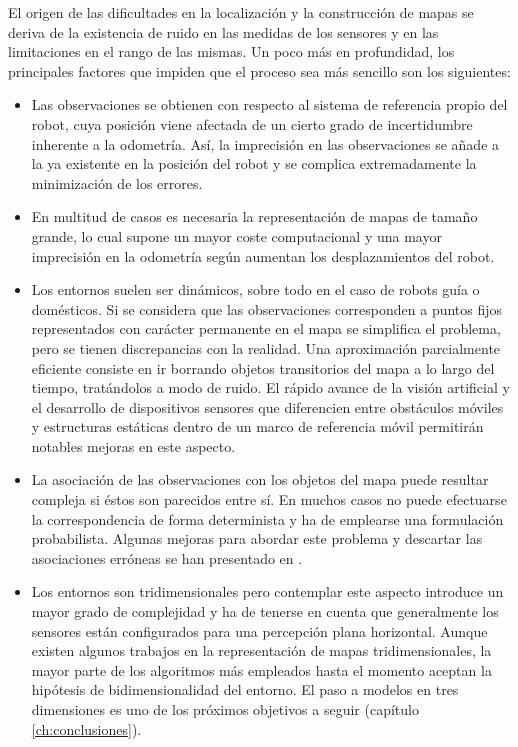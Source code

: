 El origen de las dificultades en la localización y la construcción de mapas se deriva de la existencia de ruido en las medidas de los sensores y en las limitaciones en el rango de las mismas. Un poco más en profundidad, los principales factores que impiden que el proceso sea más sencillo son los siguientes:
\begin{itemize}
  \item  Las observaciones se obtienen con respecto al sistema de referencia propio del robot, cuya posición viene afectada de un cierto grado de incertidumbre inherente a la odometría. Así, la imprecisión en las observaciones se añade a la ya existente en la posición del robot y se complica extremadamente la minimización de los errores.
  \item En multitud de casos es necesaria la representación de mapas de tamaño grande, lo cual supone un mayor coste computacional y una mayor imprecisión en la odometría según aumentan los desplazamientos del robot.
  \item Los entornos suelen ser dinámicos, sobre todo en el caso de robots guía o domésticos. Si se considera que las observaciones corresponden a puntos fijos representados con carácter permanente en el mapa se simplifica el problema, pero se tienen discrepancias con la realidad. Una aproximación parcialmente eficiente consiste en ir borrando objetos transitorios del mapa a lo largo del tiempo, tratándolos a modo de ruido. El rápido avance de la visión artificial y el desarrollo de dispositivos sensores que diferencien entre obstáculos móviles y estructuras estáticas dentro de un marco de referencia móvil permitirán notables mejoras en este aspecto.
  \item La asociación de las observaciones con los objetos del mapa puede resultar compleja si éstos son parecidos entre sí. En muchos casos no puede efectuarse la correspondencia de forma determinista y ha de emplearse una formulación probabilista. Algunas mejoras para abordar este problema y descartar las asociaciones erróneas se han presentado en \cite{Rodriguez-Losada07}.
  \item Los entornos son tridimensionales pero contemplar este aspecto introduce un mayor grado de complejidad y ha de tenerse en cuenta que generalmente los sensores están configurados para una percepción plana horizontal. Aunque existen algunos trabajos en la representación de mapas tridimensionales, la mayor parte de los algoritmos más empleados hasta el momento aceptan la hipótesis de bidimensionalidad del entorno. El paso a modelos en tres dimensiones es uno de los próximos objetivos a seguir (capítulo \ref{ch:conclusiones}).
\end{itemize}

